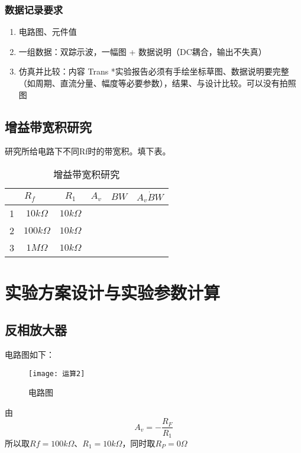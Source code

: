 \documentclass{../source/Experiment}
\begin{document}
                \subsubsection{数据记录要求}
                \begin{enumerate}
                    \item 电路图、元件值	
                    \item 一组数据：双踪示波，一幅图 + 数据说明（DC耦合，输出不失真）
                    \item 仿真并比较：内容  Trans
                    *实验报告必须有手绘坐标草图、数据说明要完整（如周期、直流分量、幅度等必要参数），结果、与设计比较。可以没有拍照图
                \end{enumerate}
        \subsection{增益带宽积研究}
        研究所给电路下不同Rf时的带宽积。填下表。
        \begin{table}[h]
            \centering
            \begin{tabular}{|c|c|c|c|c|c|}
            \hline
            \multicolumn{2}{|c|}{$R_f$} & $R_1$       & $A_v$ & $BW$     & $A_v \dot BW$ \\ \hline
            1       & $10k\Omega$       & $10k\Omega$ &      &  &       \\ \hline
            2       & $100k\Omega$      & $10k\Omega$ &     &   &       \\ \hline
            3       & $1M\Omega$        & $10k\Omega$ &   &  &    \\ \hline
            \end{tabular}
            \caption{增益带宽积研究}
            \end{table}
    \section{实验方案设计与实验参数计算}
        \subsection{反相放大器}
        电路图如下：
            \begin{figure}[h]
                \centering
                \texttt{[image: 运算2]}
                \caption{电路图}
            \end{figure}
        由$$A_v = -\frac{R_F}{R_1}$$
        所以取$Rf = 100k\Omega$、$R_1 = 10k\Omega$，同时取$R_P = 0\Omega$
\end{document}
